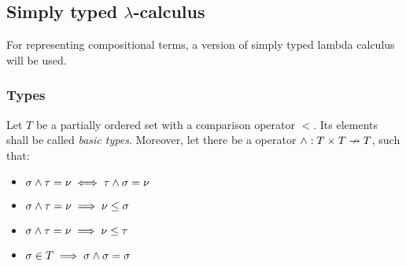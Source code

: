 \documentclass[main.tex]{subfiles}
\begin{document}
\subsection{Simply typed $\lambda$-calculus}

For representing compositional terms, a version of simply typed lambda calculus
will be used.

\subsubsection{Types}
\begin{defn}
    Let $T$ be a partially ordered
    set with a comparison operator $\less$.
    Its elements shall be called \emph{basic types}.
    Moreover, let there be a operator $\wedge : T \times T \nrightarrow T$,
    such that:
    \begin{itemize}
        \item $\sigma \wedge \tau = \nu \iff \tau \wedge \sigma = \nu$
        \item $\sigma \wedge \tau = \nu \implies \nu \leq \sigma$
        \item $\sigma \wedge \tau = \nu \implies \nu \leq \tau$
        \item $\sigma \in T       \implies \sigma \wedge \sigma = \sigma$
    \end{itemize}
\end{defn}
\end{document}
